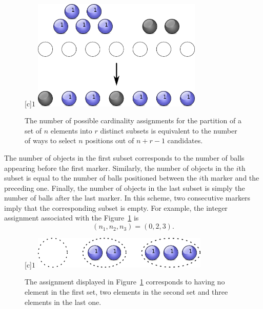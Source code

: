 \begin{figure}[htb!]
\begin{center}
\begin{psfrags}
[c]{$1$}
\includegraphics[height=5.28cm]{Figures/4Chapter/partitioning}
\end{psfrags}
\caption{The number of possible cardinality assignments for the partition of a set of $n$ elements into $r$ distinct subsets is equivalent to the number of ways to select $n$ positions out of $n + r - 1$ candidates.} 
\label{figure:Partitioning}
\end{center}
\end{figure}

The number of objects in the first subset corresponds to the number of balls appearing before the first marker.
Similarly, the number of objects in the $i$th subset is equal to the number of balls positioned between the $i$th marker and the preceding one.
Finally, the number of objects in the last subset is simply the number of balls after the last marker.
In this scheme, two consecutive markers imply that the corresponding subset is empty.
For example, the integer assignment associated with the Figure~\ref{figure:Partitioning} is
\begin{equation*}
(n_1, n_2, n_3) = (0,2,3).
\end{equation*}

\begin{figure}[htb!]
\begin{center}
\begin{psfrags}
[c]{$1$}
\includegraphics[height=1.53cm]{Figures/4Chapter/partitioning2}
\end{psfrags}
\caption{The assignment displayed in Figure~\ref{figure:Partitioning} corresponds to having no element in the first set, two elements in the second set and three elements in the last one.}
\label{figure:Partitioning2}
\end{center}
\end{figure}

